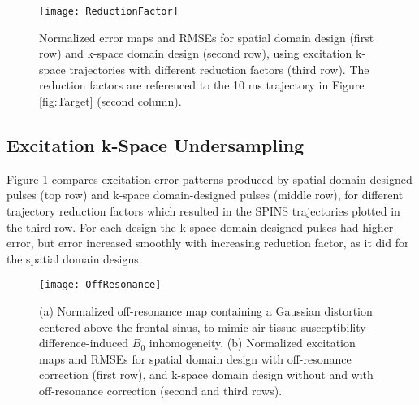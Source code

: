 
\begin{figure}
	\centering
	\texttt{[image: ReductionFactor]}
	\caption{Normalized error maps and RMSEs for spatial domain design (first row) and k-space domain design (second row), 
	using excitation k-space trajectories with different reduction factors (third row).
	The reduction factors are referenced to the 10 ms trajectory in Figure \ref{fig:Target} (second column).}
	\label{fig:kspace_PTX_Acceleration}
\end{figure}

\subsection*{Excitation k-Space Undersampling}
Figure \ref{fig:kspace_PTX_Acceleration} compares excitation error patterns produced by spatial domain-designed pulses (top row)
and k-space domain-designed pulses (middle row),
for different trajectory reduction factors which resulted in the SPINS trajectories plotted in the third row. 
For each design the k-space domain-designed pulses had higher error, 
but error increased smoothly with increasing reduction factor, as it did for the spatial domain designs. 


\begin{figure}
	\centering
	\texttt{[image: OffResonance]}
	\caption{
	(a) Normalized off-resonance map containing a Gaussian distortion centered above the frontal sinus, 
	to mimic air-tissue susceptibility difference-induced $B_0$ inhomogeneity.
	(b) Normalized excitation maps and RMSEs for spatial domain design with off-resonance correction (first row), 
	and k-space domain design without and with off-resonance correction (second and third rows).}
	\label{fig:kspace_PTX_B0}
\end{figure}

